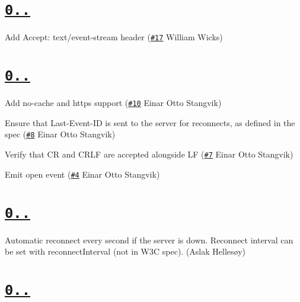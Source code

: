 \section*{\href{https://github.com/aslakhellesoy/eventsource-node/compare/v0.0.5...v0.0.6}{\tt 0..}}


\begin{DoxyItemize}
\item Add Accept\+: text/event-\/stream header (\href{https://github.com/aslakhellesoy/eventsource-node/pull/17}{\tt \#17} William Wicks)
\end{DoxyItemize}

\section*{\href{https://github.com/aslakhellesoy/eventsource-node/compare/v0.0.4...v0.0.5}{\tt 0..}}


\begin{DoxyItemize}
\item Add no-\/cache and https support (\href{https://github.com/aslakhellesoy/eventsource-node/pull/10}{\tt \#10} Einar Otto Stangvik)
\item Ensure that Last-\/\+Event-\/\+ID is sent to the server for reconnects, as defined in the spec (\href{https://github.com/aslakhellesoy/eventsource-node/pull/8}{\tt \#8} Einar Otto Stangvik)
\item Verify that CR and C\+R\+LF are accepted alongside LF (\href{https://github.com/aslakhellesoy/eventsource-node/pull/7}{\tt \#7} Einar Otto Stangvik)
\item Emit \textquotesingle{}open\textquotesingle{} event (\href{https://github.com/aslakhellesoy/eventsource-node/issues/4}{\tt \#4} Einar Otto Stangvik)
\end{DoxyItemize}

\section*{\href{https://github.com/aslakhellesoy/eventsource-node/compare/v0.0.3...v0.0.4}{\tt 0..}}


\begin{DoxyItemize}
\item Automatic reconnect every second if the server is down. Reconnect interval can be set with {\ttfamily reconnect\+Interval} (not in W3C spec). (Aslak Hellesøy)
\end{DoxyItemize}

\section*{\href{https://github.com/aslakhellesoy/eventsource-node/compare/v0.0.2...v0.0.3}{\tt 0..}}


